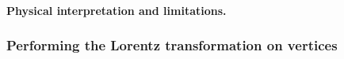 \documentclass[a4paper]{article}
\begin{document}
\paragraph{Physical interpretation and limitations.}


\subsubsection{Performing the Lorentz transformation on vertices}
\end{document}
